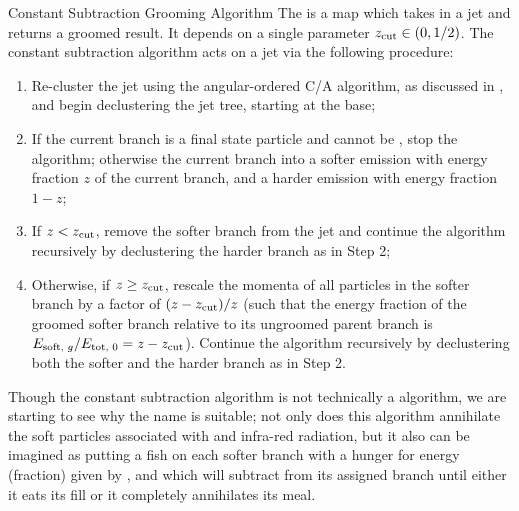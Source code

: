 \begin{definitionbox}{Constant Subtraction Grooming Algorithm}{}
    The  is a map which takes in a jet and returns a groomed result.
    It depends on a single parameter \(z_{\rm cut} \in (0, 1/2)\).
    The constant subtraction algorithm acts on a jet via the following procedure:
    \begin{enumerate}
        \item
            Re-cluster the jet using the angular-ordered C/A algorithm, as discussed in , and begin \gls{declustering} the jet tree, starting at the base;

        \item
            If the current branch is a final state particle and cannot be , stop the algorithm;
            otherwise  the current branch into a softer emission with energy fraction \(z\) of the current branch, and a harder emission with energy fraction \(1-z\);

        \item
            If \(z < z_{\rm cut}\), remove the softer branch from the jet and continue the algorithm recursively by \gls{declustering} the harder branch as in Step 2;

        \item
            Otherwise, if \(z \geq z_{\rm cut}\), rescale the momenta of all particles in the softer branch by a factor of \((z-z_{\rm cut})/z\) (such that the energy fraction of the groomed softer branch relative to its ungroomed parent branch is \(E_{\text{soft, }g}/E_{\text{tot, }0} = z - z_{\rm cut}\)).
            Continue the algorithm recursively by \gls{declustering} both the softer and the harder branch as in Step 2.
    \end{enumerate}
\end{definitionbox}

Though the constant subtraction algorithm is not technically a \PIRANHA{} algorithm, we are starting to see why the name \PIRANHA{} is suitable;
%
not only does this algorithm annihilate the soft particles associated with  and infra-red radiation, but it also can be imagined as putting a fish on each softer branch with a hunger for energy (fraction) given by \zcut, and which will subtract from its assigned branch until either it eats its fill or it completely annihilates its meal.


